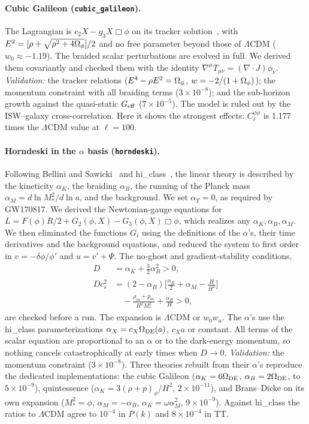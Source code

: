 \paragraph*{Cubic Galileon (\texttt{cubic\_galileon}).} The Lagrangian is $c_2X-g_3X\Box\phi$ on its tracker
solution~\cite{Deffayet2009,Barreira2013}, with $E^2=[\rho+\sqrt{\rho^2+4\Omega_\phi}]/2$ and no free parameter beyond
those of $\Lambda$CDM ($w_0\approx-1.19$). The braided scalar perturbations are evolved in full. We derived them
covariantly and checked them with the identity $\nabla^\mu T_{\mu\nu}=(\nabla\cdot J)\phi_\nu$. \emph{Validation:}
the tracker relations ($E^4-\rho E^2=\Omega_\phi$, $w=-2/(1+\Omega_\phi)$); the momentum constraint with all braiding
terms ($3\times10^{-8}$); and the sub-horizon growth against the quasi-static $G_{\rm eff}$ ($7\times10^{-5}$). The
model is ruled out by the ISW--galaxy cross-correlation. Here it shows the strongest effects: $C_\ell^{\phi\phi}$ is
1.177 times the $\Lambda$CDM value at $\ell=100$.

\paragraph*{Horndeski in the $\alpha$ basis (\texttt{horndeski}).} Following Bellini and Sawicki~\cite{Bellini2014}
and hi\_class~\cite{Zumalacarregui2017}, the linear theory is described by the kineticity $\alpha_K$, the braiding
$\alpha_B$, the running of the Planck mass $\alpha_M=d\ln M_*^2/d\ln a$, and the background. We set $\alpha_T=0$,
as required by GW170817. We derived the Newtonian-gauge equations for $L=F(\phi)R/2+G_2(\phi,X)-G_3(\phi,X)\Box\phi$,
which realizes any $\alpha_K,\alpha_B,\alpha_M$. We then eliminated the functions $G_i$ using the definitions of
the $\alpha$'s, their time derivatives and the background equations, and reduced the system to first order in
$v=-\delta\phi/\phi'$ and $u=v'+\Psi$. The no-ghost and gradient-stability conditions,
\begin{align}
D&=\alpha_K+\tfrac32\alpha_B^2>0,\nonumber\\
Dc_s^2&=(2-\alpha_B)\Big[\frac{\alpha_B}{2}+\alpha_M-\frac{\dot H}{H^2}\Big]\nonumber\\
&\quad-\frac{\rho_m+p_m}{H^2M_*^2}+\frac{\dot\alpha_B}{H}>0,
\end{align}
are checked before a run. The expansion is $\Lambda$CDM or $w_0w_a$. The $\alpha$'s use the hi\_class
parameterizations $\alpha_X=c_X\Omega_{\rm DE}(a)$, $c_Xa$ or constant. All terms of the scalar equation are
proportional to an $\alpha$ or to the dark-energy momentum, so nothing cancels catastrophically at early times when
$D\to0$. \emph{Validation:} the momentum constraint ($3\times10^{-8}$). Three theories rebuilt from their $\alpha$'s
reproduce the dedicated implementations: the cubic Galileon ($\alpha_K=6\Omega_{\rm DE}$, $\alpha_B=2\Omega_{\rm DE}$, to
$5\times10^{-9}$), quintessence ($\alpha_K=3(\rho+p)_\phi/H^2$, $2\times10^{-11}$), and Brans--Dicke on its own
expansion ($M_*^2=\phi$, $\alpha_M=-\alpha_B$, $\alpha_K=\omega\alpha_M^2$, $9\times10^{-9}$). Against hi\_class
the ratios to $\Lambda$CDM agree to $10^{-4}$ in $P(k)$ and $8\times10^{-4}$ in TT.

